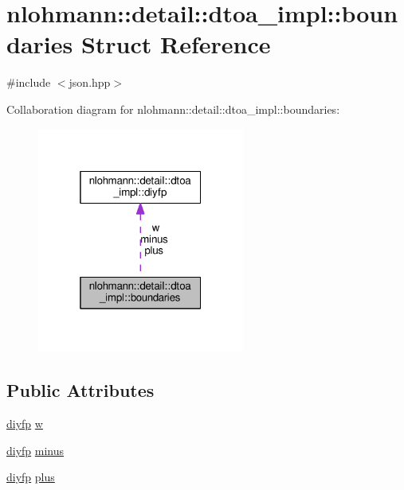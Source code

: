 \hypertarget{structnlohmann_1_1detail_1_1dtoa__impl_1_1boundaries}{}\section{nlohmann\+:\+:detail\+:\+:dtoa\+\_\+impl\+:\+:boundaries Struct Reference}
\label{structnlohmann_1_1detail_1_1dtoa__impl_1_1boundaries}


{\ttfamily \#include $<$json.\+hpp$>$}



Collaboration diagram for nlohmann\+:\+:detail\+:\+:dtoa\+\_\+impl\+:\+:boundaries\+:\nopagebreak
\begin{figure}[H]
\begin{center}
\leavevmode
\includegraphics[width=193pt]{structnlohmann_1_1detail_1_1dtoa__impl_1_1boundaries__coll__graph}
\end{center}
\end{figure}
\subsection*{Public Attributes}
\begin{DoxyCompactItemize}
\item 
\hyperlink{structnlohmann_1_1detail_1_1dtoa__impl_1_1diyfp}{diyfp} \hyperlink{structnlohmann_1_1detail_1_1dtoa__impl_1_1boundaries_ad1668c60aeade5f2557fafed8b8aee1a}{w}
\item 
\hyperlink{structnlohmann_1_1detail_1_1dtoa__impl_1_1diyfp}{diyfp} \hyperlink{structnlohmann_1_1detail_1_1dtoa__impl_1_1boundaries_aec4e5028333c01f3229062f31ce16763}{minus}
\item 
\hyperlink{structnlohmann_1_1detail_1_1dtoa__impl_1_1diyfp}{diyfp} \hyperlink{structnlohmann_1_1detail_1_1dtoa__impl_1_1boundaries_a3321ae2816a6ec5250a0d8e29f798232}{plus}
\end{DoxyCompactItemize}


